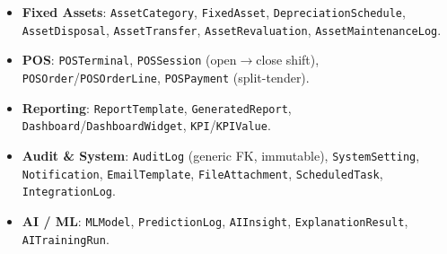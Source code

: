 \documentclass[12pt,a4paper]{report}
\begin{document}
\begin{itemize}
  \item \textbf{Fixed Assets}: \texttt{AssetCategory}, \texttt{FixedAsset}, \texttt{DepreciationSchedule}, \texttt{AssetDisposal}, \texttt{AssetTransfer}, \texttt{AssetRevaluation}, \texttt{AssetMaintenanceLog}.
  \item \textbf{POS}: \texttt{POSTerminal}, \texttt{POSSession} (open$\to$close shift), \texttt{POSOrder}/\texttt{POSOrderLine}, \texttt{POSPayment} (split-tender).
  \item \textbf{Reporting}: \texttt{ReportTemplate}, \texttt{GeneratedReport}, \texttt{Dashboard}/\texttt{DashboardWidget}, \texttt{KPI}/\texttt{KPIValue}.
  \item \textbf{Audit \& System}: \texttt{AuditLog} (generic FK, immutable), \texttt{SystemSetting}, \texttt{Notification}, \texttt{EmailTemplate}, \texttt{FileAttachment}, \texttt{ScheduledTask}, \texttt{IntegrationLog}.
  \item \textbf{AI / ML}: \texttt{MLModel}, \texttt{PredictionLog}, \texttt{AIInsight}, \texttt{ExplanationResult}, \texttt{AITrainingRun}.
\end{itemize}
\end{document}
